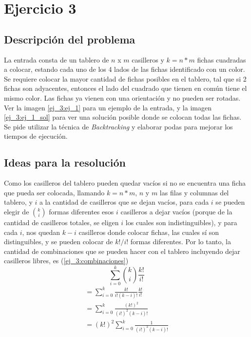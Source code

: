 \section{Ejercicio 3}

\subsection{Descripci\'on del problema}

La entrada consta de un tablero de $n$ x $m$ casilleros y $k=n*m$ fichas cuadradas a colocar, estando cada uno de los 4 lados de las fichas identificado con un color. Se requiere colocar la mayor cantidad de fichas posibles en el tablero, tal que si 2 fichas son adyacentes, entonces el lado del cuadrado que tienen en com\'un tiene el mismo color. Las fichas ya vienen con una orientaci\'on y no pueden ser rotadas.
Ver la imagen \ref{ej_3:ej_1} para un ejemplo de la entrada, y la imagen \ref{ej_3:ej_1_sol} para ver una soluci\'on posible donde se colocan todas las fichas.
Se pide utilizar la t\'ecnica de \emph{Backtracking}
y elaborar podas para mejorar los tiempos de ejecuci\'on.



\subsection{Ideas para la resoluci\'on} \label{ej_3:idea}

Como los casilleros del tablero pueden quedar vac\'ios si no se encuentra una ficha que pueda ser colocada,
llamando $k=n*m$, $n$ y $m$ las filas y columnas del tablero, y $i$ a la cantidad de casilleros que se dejan vac\'ios, para cada $i$ se pueden elegir de $\binom{k}{i}$ formas diferentes esos $i$ casilleros a dejar vac\'ios (porque de la cantidad de casilleros totales, se eligen $i$ los cuales son indistinguibles),
y para cada $i$, nos quedan $k - i$ casilleros donde colocar fichas, las cuales s\'i son distinguibles, y se pueden colocar de $k!/i!$ formas diferentes.
Por lo tanto, la cantidad de combinaciones que se pueden hacer con el tablero incluyendo dejar casilleros libres, es (\ref{ej_3:combinaciones})
\begin{equation}
	\sum_{i=0}^{k}\binom{k}{i}\frac{k!}{i!} \label{ej_3:combinaciones}
\end{equation}
\begin{equation*}
\begin{split}
	= \sum_{i=0}^{k}\frac{k!}{i!(k-i)!}\frac{k!}{i!}\\
	= \sum_{i=0}^{k}\frac{(k!)^2}{(i!)^2(k-i)!} \\
	= (k!)^2\sum_{i=0}^{k}\frac{1}{(i!)^2(k-i)!}
\end{split}
\end{equation*}

